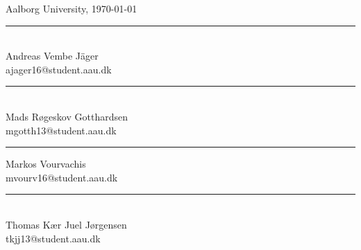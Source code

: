 \vspace{0.5\baselineskip}\hfill Aalborg University, \today
\vfill


\vspace{1.5\baselineskip}
\begin{minipage}[b]{0.45\textwidth}
 \centering
 \rule{\textwidth}{0.45pt}\\
  Andreas Vembe Jäger\\
 {\footnotesize ajager16@student.aau.dk}
\end{minipage}
\vspace{1.5\baselineskip}
\hfill
\begin{minipage}[b]{0.45\textwidth}
 \centering
 \rule{\textwidth}{0.45pt}\\
  Mads Røgeskov Gotthardsen\\
 {\footnotesize mgotth13@student.aau.dk}
\end{minipage}

\begin{minipage}[b]{0.45\textwidth}
 \centering
 \rule{\textwidth}{0.5pt}
   Markos Vourvachis\\
 {\footnotesize mvourv16@student.aau.dk}
\end{minipage}
\vspace{1.5\baselineskip}
\hfill
\begin{minipage}[b]{0.45\textwidth}
 \centering
 \rule{\textwidth}{0.45pt}\\
   Thomas Kær Juel Jørgensen\\
 {\footnotesize tkjj13@student.aau.dk}
\end{minipage}

